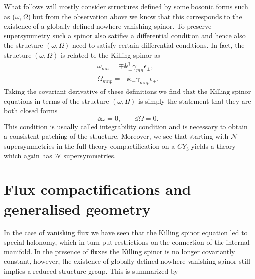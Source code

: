 What follows will mostly consider structures defined by some bosonic forms such as ($\omega,\Omega$) but from the observation above we know that this corresponds to the existence of a globally defined nowhere vanishing spinor. To preserve supersymmetry such a spinor also satifies a differential condition and hence also the structure $(\omega,\Omega)$ need to satisfy certain differential conditions. In fact, the structure $(\omega,\Omega)$ is related to the Killing spinor as 
\begin{align}
    \omega_{mn} = \mp\ii \epsilon^\dagger_\pm\gamma_{mn}\epsilon_\pm,\\
    \Omega_{mnp} = -\ii\epsilon^\dagger_-\gamma_{mnp}\epsilon_+.
\end{align}
Taking the covariant derivative of these definitions we find that the Killing spinor equations in terms of the structure $(\omega,\Omega)$ is simply the statement that they are both closed forms 
\begin{equation}
    \dd \omega = 0, \qquad \dd \Omega = 0.
\end{equation}
This condition is usually called integrability condition and is necessary to obtain a consistent patching of the structure. Moreover, we see that starting with $\mathcal{N}$ supersymmetries in the full theory compactification on a $CY_3$ yields a theory which again has $\mathcal{N}$ supersymmetries.

\section{Flux compactifications and generalised geometry}
In the case of vanishing flux we have seen that the Killing spinor equation led to special holonomy, which in turn put restrictions on the connection of the internal manifold. In the presence of fluxes the Killing spinor is no longer covariantly constant, however, the existence of globally defined nowhere vanishing spinor still implies a reduced structure group. This is summarized by 

